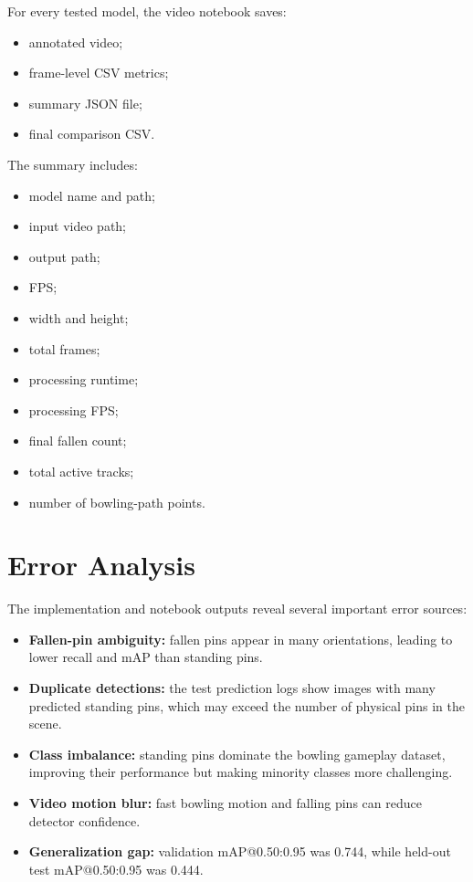 \documentclass[12pt,a4paper]{article}
\begin{document}
For every tested model, the video notebook saves:
\begin{itemize}[noitemsep]
    \item annotated video;
    \item frame-level CSV metrics;
    \item summary JSON file;
    \item final comparison CSV.
\end{itemize}

The summary includes:
\begin{itemize}[noitemsep]
    \item model name and path;
    \item input video path;
    \item output path;
    \item FPS;
    \item width and height;
    \item total frames;
    \item processing runtime;
    \item processing FPS;
    \item final fallen count;
    \item total active tracks;
    \item number of bowling-path points.
\end{itemize}

\section{Error Analysis}

The implementation and notebook outputs reveal several important error sources:
\begin{itemize}
    \item \textbf{Fallen-pin ambiguity:} fallen pins appear in many orientations, leading to lower recall and mAP than standing pins.
    \item \textbf{Duplicate detections:} the test prediction logs show images with many predicted standing pins, which may exceed the number of physical pins in the scene.
    \item \textbf{Class imbalance:} standing pins dominate the bowling gameplay dataset, improving their performance but making minority classes more challenging.
    \item \textbf{Video motion blur:} fast bowling motion and falling pins can reduce detector confidence.
    \item \textbf{Generalization gap:} validation mAP@0.50:0.95 was 0.744, while held-out test mAP@0.50:0.95 was 0.444.
\end{itemize}
\end{document}
